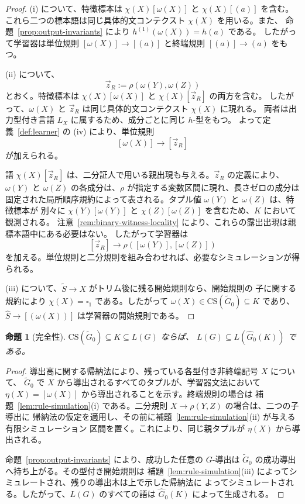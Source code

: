 \documentclass[11pt,a4paper]{ltjsarticle}
\newtheorem{proposition}[theorem]{命題}
\theoremstyle{remark}
\newcommand{\CS}{\mathrm{CS}}
\newcommand{\tuple}[1]{\vec{#1}}
\newcommand{\blank}{\square}
\begin{document}
\begin{proof}
(i) について、特徴標本は \(\chi(X)[\omega(X)]\) と \(\chi(X)[(a)]\) を含む。
これら二つの標本語は同じ具体的文コンテクスト \(\chi(X)\) を用いる。また、
命題~\ref{prop:output-invariants} により \(h^{(1)}(\omega(X))=h(a)\) である。
したがって学習器は単位規則 \([\omega(X)]\to[(a)]\) と終端規則
\([(a)]\to(a)\) をもつ。

(ii) について、
\[
  \tuple z_R:=\rho(\omega(Y),\omega(Z))
\]
とおく。特徴標本は \(\chi(X)[\omega(X)]\) と \(\chi(X)[\tuple z_R]\) の両方を含む。
したがって、\(\omega(X)\) と \(\tuple z_R\) は同じ具体的文コンテクスト \(\chi(X)\) に現れる。
両者は出力型付き言語 \(L_X\) に属するため、成分ごとに同じ \(h\)-型をもつ。
よって定義~\ref{def:learner} の (iv) により、単位規則
\[
  [\omega(X)]\to[\tuple z_R]
\]
が加えられる。

語 \(\chi(X)[\tuple z_R]\) は、二分証人で用いる親出現も与える。\(\tuple z_R\) の定義により、
\(\omega(Y)\) と \(\omega(Z)\) の各成分は、\(\rho\) が指定する変数区間に現れ、長さゼロの成分は
固定された局所順序規約によって表される。タプル値 \(\omega(Y)\) と \(\omega(Z)\) は、特徴標本が
別々に \(\chi(Y)[\omega(Y)]\) と \(\chi(Z)[\omega(Z)]\) を含むため、\(K\) において観測される。
注意~\ref{rem:binary-witness-locality} により、これらの露出出現は親標本語中にある必要はない。
したがって学習器は
\[
  [\tuple z_R]\to\rho([\omega(Y)],[\omega(Z)])
\]
を加える。単位規則と二分規則を組み合わせれば、必要なシミュレーションが得られる。

(iii) について、\(\widetilde S\to X\) がトリム後に残る開始規則なら、開始規則の
子に関する規約により \(\chi(X)=\blank_1\) である。したがって
\(\omega(X)\in\CS(\widetilde G_0)\subseteq K\) であり、
\(\widehat S\to[(\omega(X))]\) は学習器の開始規則である。
\end{proof}

\begin{proposition}[完全性]
\label{prop:completeness}
\(\CS(\widetilde G_0)\subseteq K\subseteq L(G)\) ならば、
\(L(G)\subseteq L(\widehat G_0(K))\) である。
\end{proposition}

\begin{proof}
導出高に関する帰納法により、残っている各型付き非終端記号 \(X\) について、
\(\widetilde G_0\) で \(X\) から導出されるすべてのタプルが、学習器文法において
\(\eta(X)=[\omega(X)]\) から導出されることを示す。終端規則の場合は
補題~\ref{lem:rule-simulation}(i) である。二分規則 \(X\to\rho(Y,Z)\) の場合は、二つの子導出に
帰納法の仮定を適用し、その前に補題~\ref{lem:rule-simulation}(ii) が与える有限シミュレーション
区間を置く。これにより、同じ親タプルが \(\eta(X)\) から導出される。

命題~\ref{prop:output-invariants} により、成功した任意の \(G\)-導出は
\(\widetilde G_0\) の成功導出へ持ち上がる。その型付き開始規則は
補題~\ref{lem:rule-simulation}(iii) によってシミュレートされ、残りの導出木は上で示した帰納法に
よってシミュレートされる。したがって、\(L(G)\) のすべての語は
\(\widehat G_0(K)\) によって生成される。
\end{proof}
\end{document}
